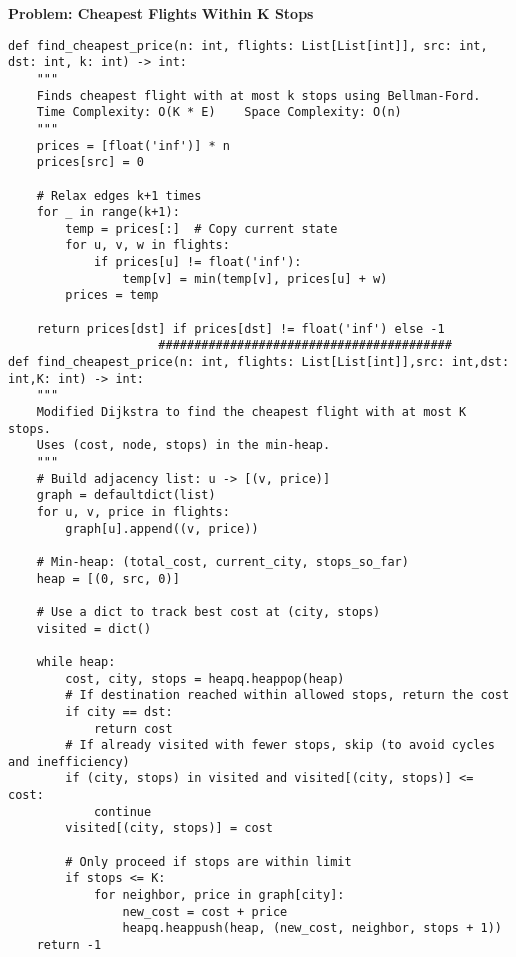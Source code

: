 \noindent\textbf{Problem: Cheapest Flights Within K Stops}
\begin{verbatim}
def find_cheapest_price(n: int, flights: List[List[int]], src: int, dst: int, k: int) -> int:
    """
    Finds cheapest flight with at most k stops using Bellman-Ford.
    Time Complexity: O(K * E)    Space Complexity: O(n)
    """
    prices = [float('inf')] * n
    prices[src] = 0
    
    # Relax edges k+1 times
    for _ in range(k+1):
        temp = prices[:]  # Copy current state
        for u, v, w in flights:
            if prices[u] != float('inf'):
                temp[v] = min(temp[v], prices[u] + w)
        prices = temp
    
    return prices[dst] if prices[dst] != float('inf') else -1
                     #########################################
def find_cheapest_price(n: int, flights: List[List[int]],src: int,dst: int,K: int) -> int:
    """
    Modified Dijkstra to find the cheapest flight with at most K stops.
    Uses (cost, node, stops) in the min-heap.
    """
    # Build adjacency list: u -> [(v, price)]
    graph = defaultdict(list)
    for u, v, price in flights:
        graph[u].append((v, price))
    
    # Min-heap: (total_cost, current_city, stops_so_far)
    heap = [(0, src, 0)]
    
    # Use a dict to track best cost at (city, stops)
    visited = dict()

    while heap:
        cost, city, stops = heapq.heappop(heap)
        # If destination reached within allowed stops, return the cost
        if city == dst:
            return cost
        # If already visited with fewer stops, skip (to avoid cycles and inefficiency)
        if (city, stops) in visited and visited[(city, stops)] <= cost:
            continue
        visited[(city, stops)] = cost

        # Only proceed if stops are within limit
        if stops <= K:
            for neighbor, price in graph[city]:
                new_cost = cost + price
                heapq.heappush(heap, (new_cost, neighbor, stops + 1))
    return -1
\end{verbatim}

